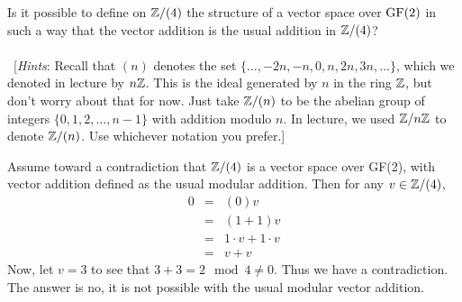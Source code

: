 \begin{problem}[Golan 56]

Is it possible to define on $\mathbb{Z}/(4)$ the structure of a vector space over
$\operatorname{GF}(2)$ in such a way that the vector addition is the usual addition in
$\mathbb{Z}/(4)$?\\
\\
~[{\it Hints}: Recall that $(n)$ denotes the set $\{\dots, -2n, -n, 0, n, 2n,
  3n, \dots\}$, which we denoted in lecture by $n\mathbb{Z}$.  This is the ideal
  generated by $n$ in the ring $\mathbb{Z}$, but don't worry about that for now. Just
  take $\mathbb{Z}/(n)$ to be the abelian group of integers $\{0, 1, 2, \dots, n-1\}$
  with addition modulo $n$.  In lecture, we used $\mathbb{Z}/n\mathbb{Z}$ to denote
  $\mathbb{Z}/(n)$. Use whichever notation you prefer.]

\end{problem}
\smallskip
\begin{solution}
Assume toward a contradiction that $\mathbb{Z}/(4)$ is a vector space over GF(2), with vector addition defined as the usual modular addition. Then for any $v \in \mathbb{Z}/(4)$,
\begin{eqnarray*}
0 & = & (0)v \\ & = & (1+1)v \\ & = & 1 \cdot v + 1 \cdot v \\ & = & v + v
\end{eqnarray*}
Now, let $v = 3$ to see that $3 + 3 = 2\mod{4} \neq 0$. Thus we have a contradiction. The answer is no, it is not possible with the usual modular vector addition.
\end{solution}

\probskip

\newcommand\R{\fld{R}}

